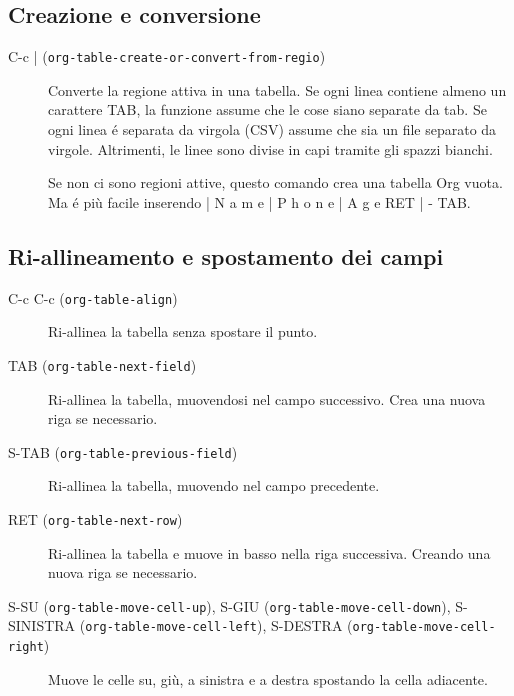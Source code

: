 \documentclass[11pt]{article}
\begin{document}
\subsection*{Creazione e conversione}
\label{sec:org3f50e5e}
\begin{description}
\item[{C-c | (\texttt{org-table-create-or-convert-from-regio})}] Converte la regione attiva in una tabella. Se ogni linea contiene
almeno un carattere TAB, la funzione assume che le cose
siano separate da tab. Se ogni linea é separata da virgola (CSV)
assume che sia un file separato da virgole. Altrimenti, le linee sono
divise in capi tramite gli spazzi bianchi.

Se non ci sono regioni attive, questo comando crea una tabella Org
vuota. Ma é più facile inserendo | N a m e | P h o n e | A g e RET | - TAB.
\end{description}

\subsection*{Ri-allineamento e spostamento dei campi}
\label{sec:orgb5b7cd0}
\begin{description}
\item[{C-c C-c (\texttt{org-table-align})}] Ri-allinea la tabella senza spostare il punto.

\item[{TAB (\texttt{org-table-next-field})}] Ri-allinea la tabella, muovendosi nel campo successivo. Crea una
nuova riga se necessario.

\item[{S-TAB (\texttt{org-table-previous-field})}] Ri-allinea la tabella, muovendo nel campo precedente.

\item[{RET (\texttt{org-table-next-row})}] Ri-allinea la tabella e muove in basso nella riga
successiva. Creando una nuova riga se necessario.

\item[{S-SU (\texttt{org-table-move-cell-up}), S-GIU (\texttt{org-table-move-cell-down}), S-SINISTRA (\texttt{org-table-move-cell-left}), S-DESTRA (\texttt{org-table-move-cell-right})}] Muove le celle su, giù, a sinistra e a destra spostando la cella adiacente.
\end{description}
\end{document}
